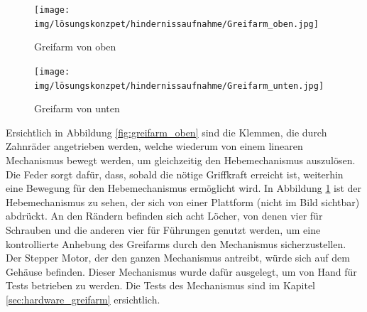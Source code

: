 \documentclass[../main.tex]{subfiles}
\begin{document}
\begin{figure}[h!]
    \centering
    \begin{minipage}[t]{0.45\textwidth}
        \centering
        \texttt{[image: img/lösungskonzpet/hindernissaufnahme/Greifarm\_oben.jpg]}
        \caption{Greifarm von oben}
        \label{fig:greifarm_oben}
    \end{minipage}
    \hfill
    \begin{minipage}[t]{0.45\textwidth}
        \centering
        \texttt{[image: img/lösungskonzpet/hindernissaufnahme/Greifarm\_unten.jpg]}
        \caption{Greifarm von unten}
        \label{fig:greifarm_unten}
    \end{minipage}
\end{figure}

Ersichtlich in Abbildung \ref{fig:greifarm_oben} sind die Klemmen, die durch Zahnräder angetrieben werden, welche wiederum von einem linearen Mechanismus bewegt werden, um gleichzeitig den Hebemechanismus auszulösen. Die Feder sorgt dafür, dass, sobald die nötige Griffkraft erreicht ist, weiterhin eine Bewegung für den Hebemechanismus ermöglicht wird. In Abbildung \ref{fig:greifarm_unten} ist der Hebemechanismus zu sehen, der sich von einer Plattform (nicht im Bild sichtbar) abdrückt. An den Rändern befinden sich acht Löcher, von denen vier für Schrauben und die anderen vier für Führungen genutzt werden, um eine kontrollierte Anhebung des Greifarms durch den Mechanismus sicherzustellen.
Der Stepper Motor, der den ganzen Mechanismus antreibt, würde sich auf dem Gehäuse befinden. Dieser Mechanismus wurde dafür ausgelegt, um von Hand für Tests betrieben zu werden. Die Tests des Mechanismus sind im Kapitel \ref{sec:hardware_greifarm} ersichtlich.
\end{document}
